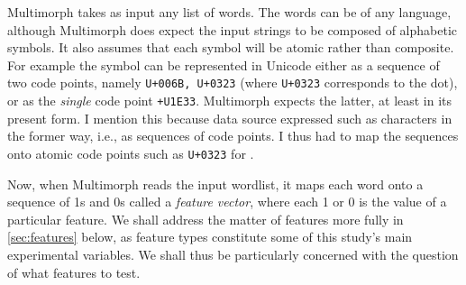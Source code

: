 Multimorph takes as input any list of words. The words can be of any
language, although Multimorph does expect the input strings to be composed
of alphabetic symbols. It also assumes that each symbol will be atomic rather 
than composite. 
For example the symbol \textsf{} can be represented in Unicode either 
as a sequence of two code points, namely \texttt{U+006B, U+0323} 
(where \texttt{U+0323}
corresponds to the dot), or as the \emph{single} code point \texttt{+U1E33}. 
Multimorph 
expects the latter, at least in its present form. I mention this because data source 
expressed 
such as characters in the former way, i.e., as sequences of code points. I thus had
to map the sequences onto atomic code points such as \texttt{U+0323} 
for \textsf{}.


Now, when Multimorph reads the input wordlist, it maps each word onto
a sequence of 1s and 0s called a \emph{feature vector}, where each 1 or 0 is the value of a
particular feature.  %
We shall address the matter of features more fully in \ref{sec:features} below, as feature types
constitute some of this study's main experimental variables. We shall thus be particularly 
concerned with the question of what features to test.



